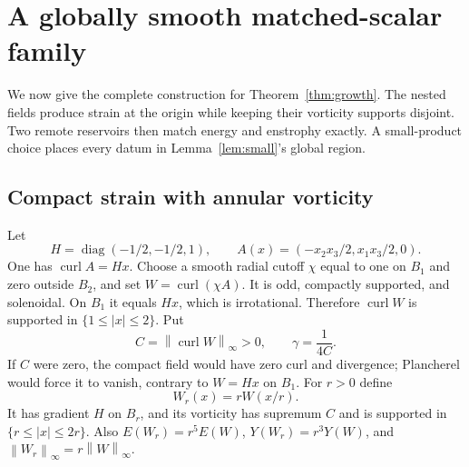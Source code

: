 \documentclass[11pt]{article}
\theoremstyle{remark}
\newcommand{\curl}{\operatorname{curl}}
\newcommand{\diag}{\operatorname{diag}}
\newcommand{\norm}[1]{\left\lVert#1\right\rVert}
\begin{document}
\section{A globally smooth matched-scalar family}\label{sec:growth}
We now give the complete construction for Theorem~\ref{thm:growth}.
The nested fields produce strain at the origin while keeping their
vorticity supports disjoint. Two remote reservoirs then match energy and
enstrophy exactly. A small-product choice places every datum in
Lemma~\ref{lem:small}'s global region.

\subsection{Compact strain with annular vorticity}
Let
\begin{equation}
 H=\diag(-1/2,-1/2,1),\qquad
 A(x)=(-x_2x_3/2,x_1x_3/2,0).
\end{equation}
One has $\curl A=Hx$. Choose a smooth radial cutoff $\chi$ equal to one
on $B_1$ and zero outside $B_2$, and set $W=\curl(\chi A)$. It is odd,
compactly supported, and solenoidal. On $B_1$ it equals $Hx$, which is
irrotational. Therefore $\curl W$ is supported in
$\{1\le|x|\le2\}$. Put
\begin{equation}
 C=\norm{\curl W}_\infty>0,\qquad \gamma=\frac{1}{4C}.
 \label{eq:gamma}
\end{equation}
If $C$ were zero, the compact field would have zero curl and divergence;
Plancherel would force it to vanish, contrary to $W=Hx$ on $B_1$.
For $r>0$ define
\begin{equation}
 W_r(x)=rW(x/r).\label{eq:strain-scaling}
\end{equation}
It has gradient $H$ on $B_r$, and its vorticity has supremum $C$ and is
supported in $\{r\le|x|\le2r\}$. Also
$E(W_r)=r^5E(W)$, $Y(W_r)=r^3Y(W)$, and
$\norm{W_r}_\infty=r\norm W_\infty$.
\end{document}
